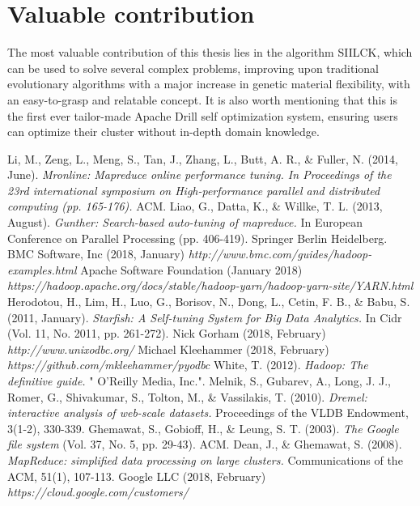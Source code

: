 \documentclass[a4paper,english]{report}
\begin{document}
		\section{Valuable contribution}
		The most valuable contribution of this thesis lies in the algorithm SIILCK, which can be used to solve several complex problems, improving upon traditional evolutionary algorithms with a major increase in genetic material flexibility, with an easy-to-grasp and relatable concept. It is also worth mentioning that this is the first ever tailor-made Apache Drill self optimization system, ensuring users can optimize their cluster without in-depth domain knowledge.
	\begin{thebibliography}{1}
		Li, M., Zeng, L., Meng, S., Tan, J., Zhang, L., Butt, A. R., \& Fuller, N. (2014, June). \emph{Mronline: Mapreduce online performance tuning. In Proceedings of the 23rd international symposium on High-performance parallel and distributed computing (pp. 165-176).} ACM.
		Liao, G., Datta, K., \& Willke, T. L. (2013, August). \emph{Gunther: Search-based auto-tuning of mapreduce.} In European Conference on Parallel Processing (pp. 406-419). Springer Berlin Heidelberg.
		BMC Software, Inc (2018, January) \emph{http://www.bmc.com/guides/hadoop-examples.html}
		Apache Software Foundation (January 2018) \emph{https://hadoop.apache.org/docs/stable/hadoop-yarn/hadoop-yarn-site/YARN.html}
		Herodotou, H., Lim, H., Luo, G., Borisov, N., Dong, L., Cetin, F. B., \& Babu, S. (2011, January). \emph{Starfish: A Self-tuning System for Big Data Analytics.} In Cidr (Vol. 11, No. 2011, pp. 261-272).
		Nick Gorham (2018, February) \emph{http://www.unixodbc.org/}
		Michael Kleehammer (2018, February) \emph{https://github.com/mkleehammer/pyodbc}
		White, T. (2012). \emph{Hadoop: The definitive guide.} " O'Reilly Media, Inc.".
		Melnik, S., Gubarev, A., Long, J. J., Romer, G., Shivakumar, S., Tolton, M., \& Vassilakis, T. (2010). \emph{Dremel: interactive analysis of web-scale datasets.} Proceedings of the VLDB Endowment, 3(1-2), 330-339.
		Ghemawat, S., Gobioff, H., \& Leung, S. T. (2003). \emph{The Google file system} (Vol. 37, No. 5, pp. 29-43). ACM.
		Dean, J., \& Ghemawat, S. (2008). \emph{MapReduce: simplified data processing on large clusters.} Communications of the ACM, 51(1), 107-113.
		Google LLC (2018, February) \emph{https://cloud.google.com/customers/}

\end{thebibliography}
\end{document}
